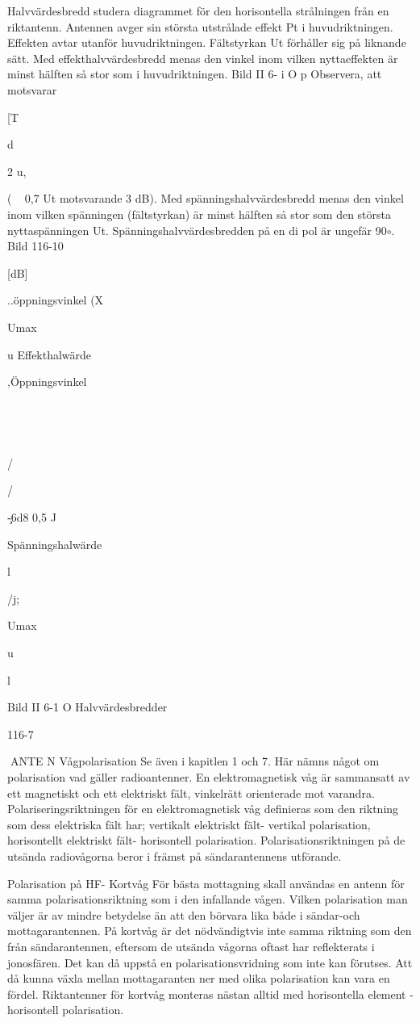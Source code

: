 \documentclass[a4paper,twoside,twocolumn,openright]{book}
\begin{document}
{{{{Halvvärdesbredd
studera diagrammet för den horisontella
strålningen från en riktantenn.
Antennen avger sin största utstrålade
effekt Pt i huvudriktningen. Effekten avtar
utanför huvudriktningen. Fältstyrkan Ut förhåller sig på liknande sätt.
Med effekthalvvärdesbredd menas den
vinkel inom vilken nyttaeffekten är minst
hälften så stor som i huvudriktningen.
Bild II 6- i O
p
Observera, att
motsvarar ~

[T

d

2 u,

( ~ 0,7 Ut motsvarande 3 dB).
Med spänningshalvvärdesbredd menas
den vinkel inom vilken spänningen (fältstyrkan) är minst hälften så stor som den
största nyttaspänningen Ut. Spänningshalvvärdesbredden på en di pol är ungefär 90$\circ$.
Bild 116-10

[dB]

..öppningsvinkel (X

Umax

u
Effekthalwärde

,Öppningsvinkel

\

\

/

/

\c-6d8
0,5
J

Spänningshalwärde

l

/j;

Umax

u

l

Bild II 6-1 O Halvvärdesbredder

116-7

ANTE N
Vågpolarisation
Se även i kapitlen 1 och 7. Här nämns något
om polarisation vad gäller radioantenner.
En elektromagnetisk våg är sammansatt
av ett magnetiskt och ett elektriskt fält, vinkelrätt orienterade mot varandra.
Polariseringsriktningen för en elektromagnetisk våg definieras som den riktning
som dess elektriska fält har;
vertikalt elektriskt fält- vertikal polarisation,
horisontellt elektriskt fält- horisontell polarisation.
Polarisationsriktningen på de utsända
radiovågorna beror i främst på sändarantennens utförande.

Polarisation på HF- Kortvåg
För bästa mottagning skall användas en
antenn för samma polarisationsriktning som
i den infallande vågen. Vilken polarisation
man väljer är av mindre betydelse än att den
börvara lika både i sändar-och mottagarantennen. På kortvåg är det nödvändigtvis inte
samma riktning som den från sändarantennen, eftersom de utsända vågorna oftast
har reflekterats i jonosfären. Det kan då
uppstå en polarisationsvridning som inte
kan förutses. Att då kunna växla mellan
mottagaranten ner med olika polarisation kan
vara en fördel. Riktantenner för kortvåg monteras nästan alltid med horisontella element
-horisontell polarisation.

}}}}
\end{document}
